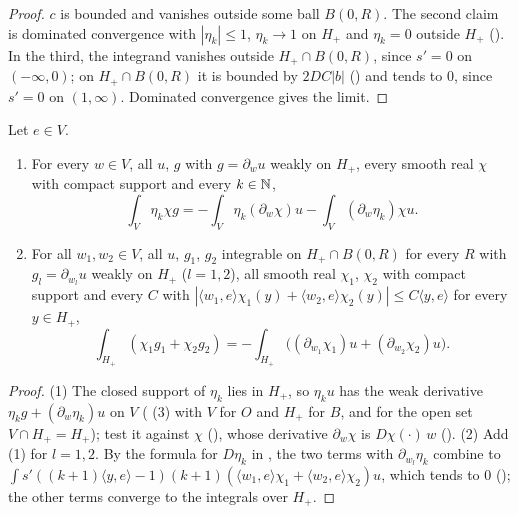 \begin{proof}
\leanok
$c$ is bounded and vanishes outside some ball $B(0, R)$. The second claim is dominated
convergence with $|\eta_k| \leq 1$, $\eta_k \to 1$ on $H_+$ and $\eta_k = 0$ outside $H_+$
(). In the third, the integrand vanishes outside
$H_+ \cap B(0, R)$, since $s' = 0$ on $(-\infty, 0)$; on $H_+ \cap B(0, R)$ it is bounded by
$2 D C |b|$ () and tends to $0$, since $s' = 0$ on $(1, \infty)$.
Dominated convergence gives the limit.
\end{proof}

\begin{theorem}
\label{thm:half-space-integration-by-parts}
\leanok
{}
Let $e \in V$.
\begin{enumerate}
  \item For every $w \in V$, all $u$, $g$ with $g = \partial_w u$ weakly on $H_+$, every smooth
    real $\chi$ with compact support and every $k \in \mathbb{N}$,
    \[
      \int_V \eta_k \chi g = -\int_V \eta_k (\partial_w \chi) u
        - \int_V (\partial_w \eta_k) \chi u .
    \]
  \item For all $w_1, w_2 \in V$, all $u$, $g_1$, $g_2$ integrable on $H_+ \cap B(0, R)$ for every
    $R$ with $g_l = \partial_{w_l} u$ weakly on $H_+$ ($l = 1, 2$), all smooth real $\chi_1$,
    $\chi_2$ with compact support and every $C$ with
    $|\langle w_1, e \rangle \chi_1(y) + \langle w_2, e \rangle \chi_2(y)|
    \leq C \langle y, e \rangle$
    for every $y \in H_+$,
    \[
      \int_{H_+} (\chi_1 g_1 + \chi_2 g_2) = -\int_{H_+} \bigl((\partial_{w_1} \chi_1) u
        + (\partial_{w_2} \chi_2) u\bigr) .
    \]
\end{enumerate}
\end{theorem}

\begin{proof}
\leanok
(1) The closed support of $\eta_k$ lies in $H_+$, so $\eta_k u$ has the weak derivative
$\eta_k g + (\partial_w \eta_k) u$ on $V$ ( (3) with $V$
for $O$ and
$H_+$ for $B$, and  for the open set $V \cap H_+ = H_+$); test it
against $\chi$ (), whose derivative $\partial_w \chi$ is
$D\chi(\cdot) \, w$ (). (2) Add (1) for
$l = 1, 2$. By the formula for $D\eta_k$ in , the two terms with
$\partial_{w_l} \eta_k$ combine to
$\int s'((k + 1) \langle y, e \rangle - 1) (k + 1) (\langle w_1, e \rangle \chi_1 +
\langle w_2, e \rangle \chi_2) u$, which tends to $0$ (); the
other terms converge to the integrals over $H_+$.
\end{proof}

